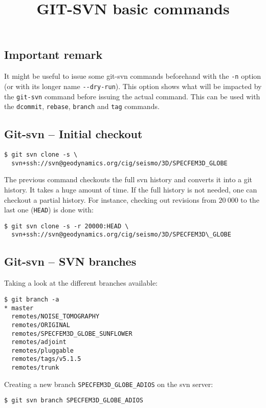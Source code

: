 \documentclass[11pt,twoside]{article}
\begin{document}
\title{GIT-SVN basic commands}
\maketitle

\subsection*{Important remark}

It might be useful to issue some git-svn commands beforehand with the \verb|-n| option (or with its longer name \verb|--dry-run|).
This option shows what will be impacted by the \texttt{git-svn} command before issuing the actual command.
This can be used with the \texttt{dcommit}, \texttt{rebase}, \texttt{branch} and \texttt{tag} commands.

\subsection*{Git-svn -- Initial checkout}
\begin{verbatim}
$ git svn clone -s \
  svn+ssh://svn@geodynamics.org/cig/seismo/3D/SPECFEM3D_GLOBE
\end{verbatim}
The previous command checkouts the full svn history and converts it into a git history. It takes a huge amount of time. If the full history is not needed, one can checkout a partial history.
For instance, checking out revisions from $20\:000$ to the last one (\texttt{HEAD}) is done with:
\begin{verbatim}
$ git svn clone -s -r 20000:HEAD \
  svn+ssh://svn@geodynamics.org/cig/seismo/3D/SPECFEM3D\_GLOBE
\end{verbatim}

\subsection*{Git-svn -- SVN branches}

Taking a look at the different branches available:
\begin{verbatim}
$ git branch -a
* master
  remotes/NOISE_TOMOGRAPHY
  remotes/ORIGINAL
  remotes/SPECFEM3D_GLOBE_SUNFLOWER
  remotes/adjoint
  remotes/pluggable
  remotes/tags/v5.1.5
  remotes/trunk
\end{verbatim}  

Creating a new branch \texttt{SPECFEM3D\_GLOBE\_ADIOS} on the svn server:
\begin{verbatim}
$ git svn branch SPECFEM3D_GLOBE_ADIOS
\end{verbatim}
\end{document}
